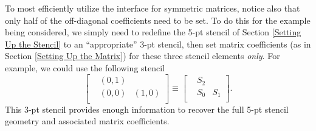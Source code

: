 To most efficiently utilize the  interface for symmetric
matrices, notice also that only half of the off-diagonal coefficients
need to be set.  To do this for the example being considered, we
simply need to redefine the 5-pt stencil of Section
\ref{Setting Up the Stencil} to an ``appropriate'' 3-pt stencil, then
set matrix coefficients (as in Section \ref{Setting Up the Matrix})
for these three stencil elements {\em only}.  For example, we could
use the following stencil
\begin{equation}\label{eqn-symmetric-stencil}
\left [
\begin{array}{ccc}
 & ( 0, 1) &         \\
 & ( 0, 0) & ( 1, 0) \\
 &         &        
\end{array}
\right ]
\equiv
\left [
\begin{array}{ccc}
 & S_2 &     \\
 & S_0 & S_1 \\
 &     &    
\end{array}
\right ] .
\end{equation}
This 3-pt stencil provides enough information to recover the full 5-pt
stencil geometry and associated matrix coefficients.

